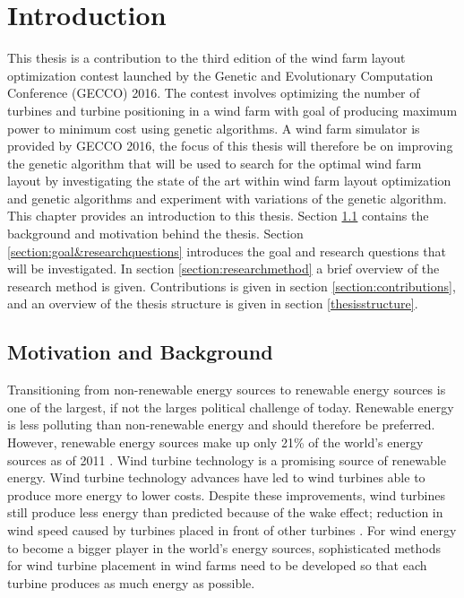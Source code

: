 \chapter{Introduction}\label{chapter:introduction}
This thesis is a contribution to the third edition of the wind farm layout optimization contest launched by the Genetic and Evolutionary Computation Conference (GECCO) 2016. The contest involves optimizing the number of turbines and turbine positioning in a wind farm with goal of producing maximum power to minimum cost using genetic algorithms. A wind farm simulator is provided by GECCO 2016, the focus of this thesis will therefore be on improving the genetic algorithm that will be used to search for the optimal wind farm layout by investigating the state of the art within wind farm layout optimization and genetic algorithms and experiment with variations of the genetic algorithm.\\

\noindent This chapter provides an introduction to this thesis. Section \ref{section:motivation&background} contains the background and motivation behind the thesis. Section \ref{section:goal&researchquestions} introduces the goal and research questions that will be investigated. In section \ref{section:researchmethod} a brief overview of the research method is given. Contributions is given in section \ref{section:contributions}, and an overview of the thesis structure is given in section \ref{thesisstructure}.


\section{Motivation and Background}\label{section:motivation&background}
Transitioning from non-renewable energy sources to renewable energy sources is one of the largest, if not the larges political challenge of today. Renewable energy is less polluting than non-renewable energy and should therefore be preferred. However, renewable energy sources make up only 21\% of the world's energy sources as of 2011 \citep{url1}. Wind turbine technology is a promising source of renewable energy. Wind turbine technology advances have led to wind turbines able to produce more energy to lower costs. Despite these improvements, wind turbines still produce less energy than predicted because of the wake effect; reduction in wind speed caused by turbines placed in front of other turbines \citep{Samorani}. For wind energy to become a bigger player in the world's energy sources, sophisticated methods for wind turbine placement in wind farms need to be developed so that each turbine produces as much energy as possible. \\


